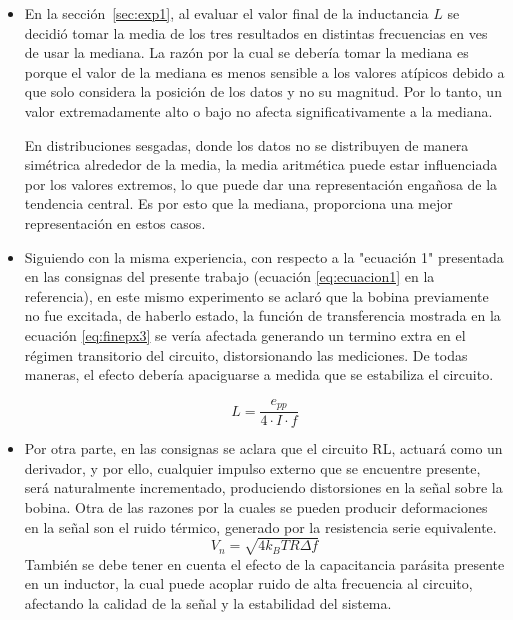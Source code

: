 \begin{itemize}

  \item En la sección~\ref{sec:exp1}, al evaluar el valor final de la inductancia $L$ se decidió tomar la media de los tres resultados en distintas frecuencias en ves de usar la mediana. La razón por la cual se debería tomar la mediana es porque el valor de la mediana es menos sensible a los valores atípicos debido a que solo considera la posición de los datos y no su magnitud. Por lo tanto, un valor extremadamente alto o bajo no afecta significativamente a la mediana.

En distribuciones sesgadas, donde  los datos no se distribuyen de manera simétrica alrededor de la media, la media aritmética puede estar influenciada por los valores extremos, lo que puede dar una representación engañosa de la tendencia central. Es por esto que la mediana, proporciona una mejor representación en estos casos.

\item Siguiendo con la misma experiencia, con respecto a la "ecuación 1" presentada en las consignas del presente trabajo (ecuación \ref{eq:ecuacion1} en la referencia), en este mismo experimento se aclaró que la bobina previamente no fue excitada, de haberlo estado, la función de transferencia mostrada en la ecuación \ref{eq:finepx3} se vería afectada generando un termino extra en el régimen transitorio del circuito, distorsionando las mediciones. De todas maneras, el efecto debería apaciguarse a medida que se estabiliza el circuito.

\begin{equation}
    L = \frac{e_{pp}}{4\cdot I \cdot f}
    \label{eq:ecuacion1}
\end{equation}

\item Por otra parte, en las consignas se aclara que el circuito RL, actuará como un derivador, y por ello, cualquier impulso externo que se encuentre presente, será naturalmente incrementado, produciendo distorsiones en la señal sobre la bobina. Otra de las razones por la cuales se pueden producir deformaciones en la señal son el ruido térmico, generado por la resistencia serie equivalente. 
\begin{equation}
    V_n = \sqrt{4k_BTR\Delta f}
\end{equation}
También se debe tener en cuenta el efecto de la capacitancia parásita presente en un inductor,  la cual puede acoplar ruido de alta frecuencia al circuito, afectando la calidad de la señal y la estabilidad del sistema.


\end{itemize}
